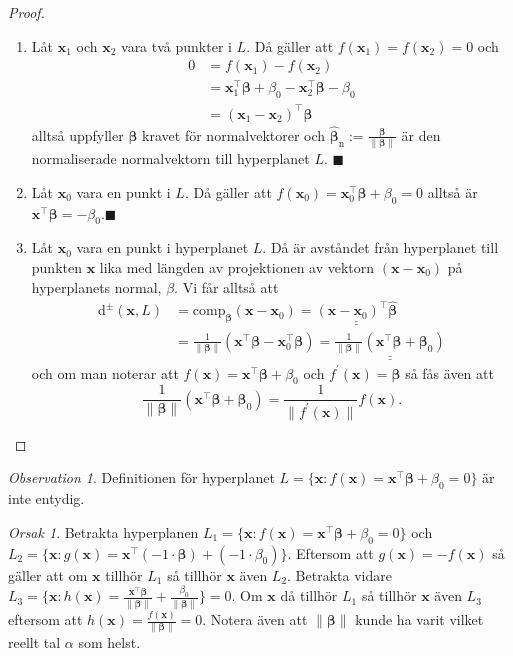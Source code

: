\documentclass[a4paper, 12pt]{report}
\theoremstyle{definition}
\theoremstyle{remark}
\newtheorem*{rem}{Observation}
\newtheorem*{reas}{Orsak}
\newcommand{\bfbeta}{{\boldsymbol{\beta}}}
\renewcommand\qedsymbol{$\blacksquare$}
\newcommand{\sephyp}{\{ \mathbf{x} : f(\mathbf{x})=\mathbf{x}^\intercal \bfbeta + \beta_0=0\}}
\begin{document}
\begin{proof}
	\leavevmode
\begin{enumerate}
	\item Låt $\mathbf{x}_1$ och $\mathbf{x}_2$ vara två punkter i $L$. Då gäller att $f(\mathbf{x}_1)=f(\mathbf{x}_2)=0$ och
	\begin{align*}
		0 &= f(\mathbf{x}_1)-f(\mathbf{x}_2)\\
		&= \mathbf{x}_1^\intercal \bfbeta + \beta_0 - \mathbf{x}_2^ \intercal \bfbeta - \beta_0\\
		&= (\mathbf{x}_1-\mathbf{x}_2)^\intercal \bfbeta
	\end{align*}
	alltså uppfyller $\bfbeta$ kravet för normalvektorer och $\widehat{\bfbeta}_\mathrm{n}:=\frac{\bfbeta}{\|\bfbeta\|}$ är den normaliserade normalvektorn till hyperplanet $L$. \hfill\qedsymbol
	\item Låt $\mathbf{x}_0$ vara en punkt i $L$. Då gäller att $f(\mathbf{x}_0)=\mathbf{x}_0^\intercal \bfbeta + \beta_0 = 0$ alltså är $\mathbf{x}^\intercal \bfbeta = - \beta_0$.\hfill \qedsymbol
	\item Låt $\mathbf{x}_0$ vara en punkt i hyperplanet $L$. Då är avståndet från hyperplanet till punkten $\mathbf{x}$ lika med längden av projektionen av vektorn $(\mathbf{x}-\mathbf{x}_0)$ på hyperplanets normal, $\beta$. Vi får alltså att
	\begin{align*}
		\operatorname{d^\pm} ( \mathbf{x}, L ) &= \operatorname{comp_{\bfbeta}} ( \mathbf{x} - \mathbf{x}_0 )
		=\underline{\underline{ (\mathbf{x} - \mathbf{x}_0)^\intercal \widehat{\bfbeta} }}\\
		&= \frac{1}{\|\bfbeta\|}(\mathbf{x}^\intercal\bfbeta - \mathbf{x}_0^\intercal\bfbeta)=\underline{\underline{\frac{1}{\|\bfbeta\|}(\mathbf{x}^\intercal\bfbeta + \bfbeta_0)}}
	\end{align*}
	och om man noterar att $f(\mathbf{x})=\mathbf{x}^\intercal\bfbeta+\beta_0$ och $f^\prime(\mathbf{x})=\bfbeta$ så fås även att
	\begin{equation*}
		\frac{1}{\|\bfbeta\|}(\mathbf{x}^\intercal\bfbeta + \bfbeta_0)=\frac{1}{\|f^\prime(\mathbf{x})\|}f(\mathbf{x}).
	\end{equation*}
	\qedhere
\end{enumerate}
\end{proof}

\begin{rem}
	Definitionen för hyperplanet $L=\{ \mathbf{x} : f(\mathbf{x})=\mathbf{x}^\intercal \bfbeta + \beta_0=0\}$ är inte entydig.
\end{rem}
\begin{reas}
	Betrakta hyperplanen $L_1 = \sephyp$ och $L_2 = \{\mathbf{x}: g(\mathbf{x})=\mathbf{x}^\intercal(-1\cdot\bfbeta) + (-1 \cdot \beta_0)\}$. Eftersom att $g(\mathbf{x}) = -f(\mathbf{x})$ så gäller att om $\mathbf{x}$ tillhör $L_1$ så tillhör $\mathbf{x}$ även $L_2$.
	Betrakta vidare $L_3= \{\mathbf{x}: h(\mathbf{x})=\frac{\mathbf{x}^\intercal\bfbeta}{\|\bfbeta\|} + \frac{\beta_0}{\|\bfbeta\|}\}=0$. Om $\mathbf{x}$ då tillhör $L_1$ så tillhör $\mathbf{x}$ även $L_3$ eftersom att $h(\mathbf{x}) = \frac{f(\mathbf{x})}{\|\bfbeta\|}=0$. Notera även att $\|\bfbeta\|$ kunde ha varit vilket reellt tal $\alpha$ som helst.
\end{reas}
\end{document}
